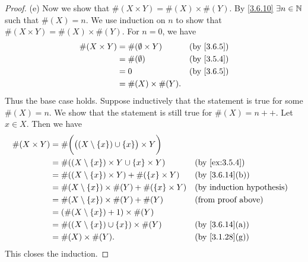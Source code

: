 \begin{proof}{(e)}
	Now we show that \(\#(X \times Y) = \#(X) \times \#(Y)\).
	By \cref{3.6.10} \(\exists n \in \mathbb{N}\) such that \(\#(X) = n\).
	We use induction on \(n\) to show that \(\#(X \times Y) = \#(X) \times \#(Y)\).
	For \(n = 0\), we have
	\begin{align*}
		\#(X \times Y) & = \#(\emptyset \times Y) &  & \by{3.6.5} \\
		               & = \#(\emptyset)          &  & \by{3.5.4} \\
		               & = 0                      &  & \by{3.6.5} \\
		               & = \#(X) \times \#(Y).
	\end{align*}
	Thus the base case holds.
	Suppose inductively that the statement is true for some \(\#(X) = n\).
	We show that the statement is still true for \(\#(X) = n++\).
	Let \(x \in X\).
	Then we have
	\begin{align*}
		\#(X \times Y) & = \#\bigg(\big((X \setminus \set{x}) \cup \set{x}\big) \times Y\bigg)                                   \\
		               & = \#((X \setminus \set{x}) \times Y \cup \set{x} \times Y)            &  & \by{ex:3.5.4}                \\
		               & = \#((X \setminus \set{x}) \times Y) + \#(\set{x} \times Y)           &  & \text{(by \cref{3.6.14}(b))} \\
		               & = \#(X \setminus \set{x}) \times \#(Y) + \#(\set{x} \times Y)         &  & \byIH                        \\
		               & = \#(X \setminus \set{x}) \times \#(Y) + \#(Y)                        &  & \text{(from proof above)}    \\
		               & = (\#(X \setminus \set{x}) + 1) \times \#(Y)                                                            \\
		               & = \#((X \setminus \set{x}) \cup \set{x}) \times \#(Y)                 &  & \text{(by \cref{3.6.14}(a))} \\
		               & = \#(X) \times \#(Y).                                                 &  & \text{(by \cref{3.1.28}(g))}
	\end{align*}
	This closes the induction.
\end{proof}

